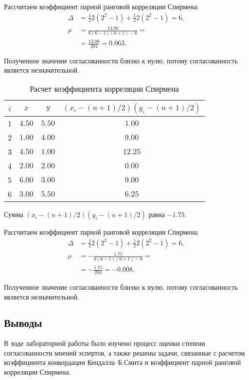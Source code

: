 Рассчитаем коэффициент парной ранговой корреляции Спирмена:
\begin{align*}
	\Delta & = \frac{1}{2} 2 (2^2-1) + \frac{1}{2} 2 (2^2-1) = 6, \\
	\rho   & = \frac{13.00}{6(6-1)(6+1)-6} =                      \\
	       & = \frac{13.00}{204} = 0.063.
\end{align*}

Полученное значение согласованности близко к нулю, потому согласованность является незначительной.

\begin{table}[H]
	\caption{Расчет коэффициента корреляции Спирмена}
	\label{tab:expert_spir3}
	\begin{tabular}{|c|c|c|c|}
		\hline
		$i$ & $x$    & $y$    & $(x_i-(n+1)/2)(y_i-(n+1)/2)$ \\ \hline
		1   & $4.50$ & $5.50$ & $1.00$                       \\ \hline
		2   & $1.00$ & $4.00$ & $9.00$                       \\ \hline
		3   & $4.50$ & $1.00$ & $12.25$                      \\ \hline
		4   & $2.00$ & $2.00$ & $0.00$                       \\ \hline
		5   & $6.00$ & $3.00$ & $9.00$                       \\ \hline
		6   & $3.00$ & $5.50$ & $6.25$                       \\ \hline
	\end{tabular}
\end{table}

Сумма $(x_i-(n+1)/2)(y_i-(n+1)/2)$ равна $-1.75$.

Рассчитаем коэффициент парной ранговой корреляции Спирмена:
\begin{align*}
	\Delta & = \frac{1}{2} 2 (2^2-1) + \frac{1}{2} 2 (2^2-1) = 6, \\
	\rho   & = -\frac{1.75}{6(6-1)(6+1)-6} =                      \\
	       & = -\frac{1.75}{204} = -0.008.
\end{align*}

Полученное значение согласованности близко к нулю, потому согласованность является незначительной.

\subsection{Выводы}

В ходе лабораторной работы было изучено процесс оценки степени согласованности мнений эспертов, а также решены задачи, связанные с расчетом коэффициента конкордации Кендалла--Б.Смита и коэффициент парной ранговой корреляции Спирмена.


